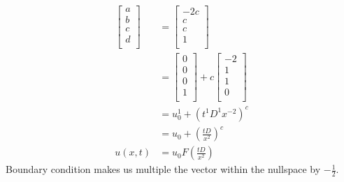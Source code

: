 \documentclass[
	date={September 4{,} 2024}
]{math486notes}
\begin{document}
\begin{equation*}
\begin{aligned}
	\left[ \begin{array}{c}
		a\\
		b\\
		c\\
		d\\
	\end{array} \right]
	&= \left[ \begin{array}{c}
		-2c\\
		c\\
		c\\
		1\\
	\end{array} \right]\\
	&= \left[ \begin{array}{c}
		0\\
		0\\
		0\\
		1\\
	\end{array} \right]
	+ c\left[ \begin{array}{c}
		-2\\
		1\\
		1\\
		0\\
	\end{array} \right]\\
	&= u_{0}^{1} + \left( t^{1}D^{1}x^{-2} \right)^{c}\\
	&= u_{0} + \left( \frac{tD}{x^{2}} \right)^{c}\\
	u(x,t) &= u_{0}F\left( \frac{tD}{x^{2}} \right)
\end{aligned}
\end{equation*}
Boundary condition makes us multiple the vector within the nullspace by $-\frac{1}{2}$.
\end{document}
